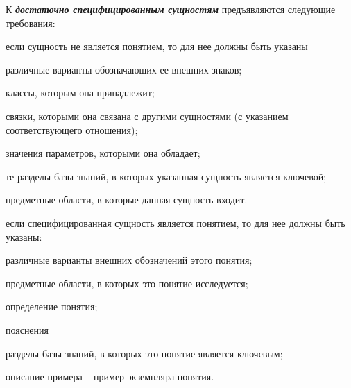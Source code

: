 К \textbf{\textit{достаточно специфицированным сущностям}} предъявляются следующие требования:
\begin{textitemize}
\item если сущность не является понятием, то для нее должны быть указаны
\begin{textitemize}
	\item различные варианты обозначающих ее внешних знаков;
	\item классы, которым она принадлежит;
	\item связки, которыми она связана с другими сущностями (с указанием соответствующего отношения);
	\item значения параметров, которыми она обладает;
	\item те разделы базы знаний, в которых указанная сущность является ключевой;
	\item предметные области, в которые данная сущность входит.
\end{textitemize}
\item если специфицированная сущность является понятием, то для нее должны быть указаны:
\begin{textitemize}
	\item различные варианты внешних обозначений этого понятия;
	\item предметные области, в которых это понятие исследуется;
	\item определение понятия;
	\item пояснения
	\item разделы базы знаний, в которых это понятие является ключевым;
	\item описание примера -- пример экземпляра понятия.
\end{textitemize}
\end{textitemize}

\begin{SCn}

\begin{scnsubdividing}
\end{scnsubdividing}
\end{SCn}

